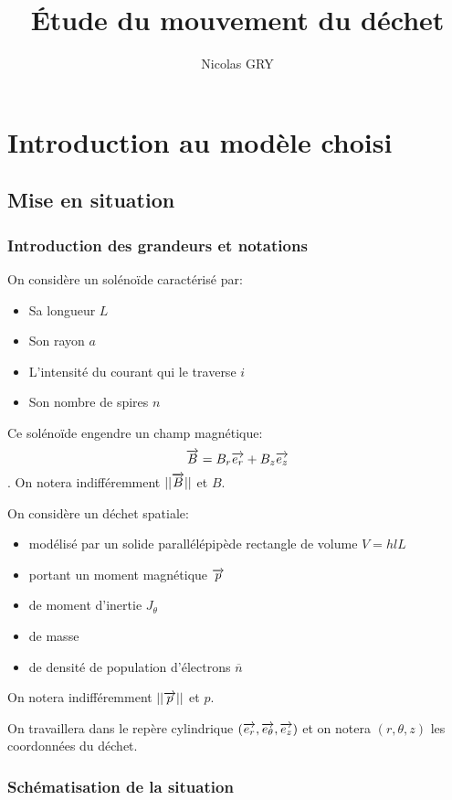 
\usepackage{global}
\graphicspath{{/home/grybouilli/TIPE/schema/}}
\author{Nicolas GRY}

\title{Étude du mouvement du déchet}


\maketitle
\tableofcontents
\newpage
\chapter{Introduction au modèle choisi}
\section{Mise en situation}
\subsection{Introduction des grandeurs et notations}

On considère un solénoïde caractérisé par:
\begin{itemize}
    \item Sa longueur $L$
    \item Son rayon $a$
    \item L'intensité du courant qui le traverse $i$
    \item Son nombre de spires $n$ 
\end{itemize}
Ce solénoïde engendre un champ magnétique:
 $$\overrightarrow{B} = B_r \overrightarrow{e_r} + B_z \overrightarrow{e_z}$$.
On notera indifféremment $||\overrightarrow{B}||$ et $B$.

On considère un déchet spatiale:
\begin{itemize}
    \item modélisé par un solide parallélépipède rectangle de volume $V=hlL$
    \item portant un moment magnétique $\overrightarrow{p}$
    \item de moment d'inertie $J_\theta$
    \item de masse 
    \item de densité de population d'électrons $\overline{n}$
\end{itemize} 
On notera indifféremment $||\overrightarrow{p}||$ et $p$.

On travaillera dans le repère cylindrique $(\overrightarrow{e_r},\overrightarrow{e_\theta},\overrightarrow{e_z})$ et on notera $(r,\theta,z)$ les coordonnées du déchet.

\subsection{Schématisation de la situation}


